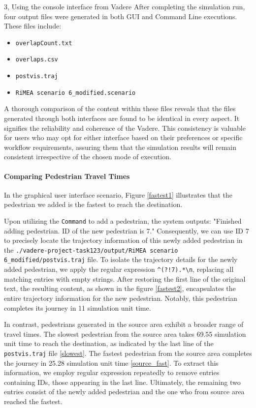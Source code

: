 \begin{task}{3, Using the console interface from Vadere}
    After completing the simulation run, four output files were generated in both GUI and Command Line executions. These files include:
    \begin{itemize}
        \item \texttt{overlapCount.txt}
        \item \texttt{overlaps.csv}
        \item \texttt{postvis.traj}
        \item \texttt{RiMEA scenario 6\_modified.scenario}
    \end{itemize}
    A thorough comparison of the content within these files reveals that the files generated through both interfaces are found to be identical in every aspect. It signifies the reliability and coherence of the Vadere. This consistency is valuable for users who may opt for either interface based on their preferences or specific workflow requirements, assuring them that the simulation results will remain consistent irrespective of the chosen mode of execution.

\paragraph{Comparing Pedestrian Travel Times}
In the graphical user interface scenario, Figure \ref{fastest1} illustrates that the pedestrian we added is the fastest to reach the destination.

Upon utilizing the \texttt{Command} to add a pedestrian, the system outputs: "Finished adding pedestrian. ID of the new pedestrian is 7." Consequently, we can use ID 7 to precisely locate the trajectory information of this newly added pedestrian in the \texttt{./vadere-project-task123/output/RiMEA scenario 6\_modified/postvis.traj} file. To isolate the trajectory details for the newly added pedestrian, we apply the regular expression \texttt{\textasciicircum(?!7).*\textbackslash n}, replacing all matching entries with empty strings. After restoring the first line of the original text, the resulting content, as shown in the figure \ref{fastest2}, encapsulates the entire trajectory information for the new pedestrian. Notably, this pedestrian completes its journey in 11 simulation unit time.

In contrast, pedestrians generated in the source area exhibit a broader range of travel times. The slowest pedestrian from the source area takes 69.55 simulation unit time to reach the destination, as indicated by the last line of the \texttt{postvis.traj} file \ref{slowest}. The fastest pedestrian from the source area completes the journey in 25.28 simulation unit time \ref{source_fast}. To extract this information, we employ regular expression repeatedly to remove entries containing IDs, those appearing in the last line. Ultimately, the remaining two entries consist of the newly added pedestrian and the one who from source area reached the fastest.


\end{task}
